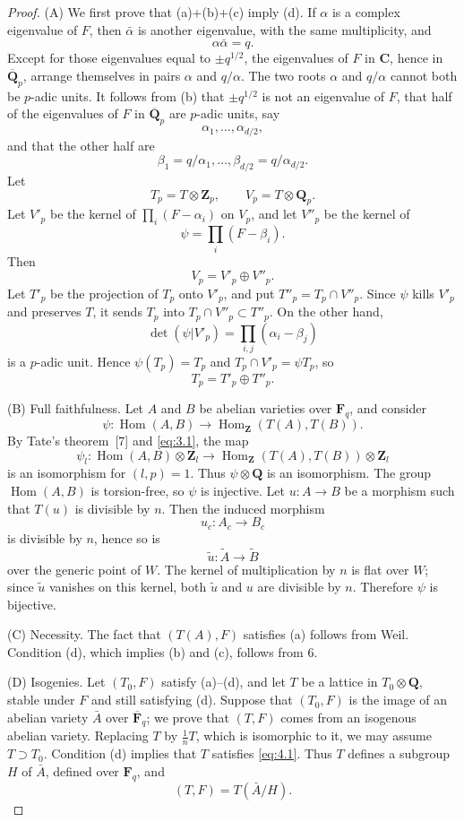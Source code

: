 \documentclass[10pt]{amsart}
\theoremstyle{plain}
\theoremstyle{remark}
\DeclareMathOperator{\Hom}{Hom}
\begin{document}
\begin{proof}
(A) We first prove that (a)+(b)+(c) imply (d). If $\alpha$ is a complex eigenvalue of $F$, then $\bar\alpha$ is another eigenvalue, with the same multiplicity, and
\[
\alpha\bar\alpha=q.
\]
Except for those eigenvalues equal to $\pm q^{1/2}$, the eigenvalues of $F$ in $\mathbf C$, hence in $\overline{\mathbf Q}_p$, arrange themselves in pairs $\alpha$ and $q/\alpha$. The two roots $\alpha$ and $q/\alpha$ cannot both be $p$-adic units. It follows from (b) that $\pm q^{1/2}$ is not an eigenvalue of $F$, that half of the eigenvalues of $F$ in $\overline{\mathbf Q}_p$ are $p$-adic units, say
\[
\alpha_1,\ldots,\alpha_{d/2},
\]
and that the other half are
\[
\beta_1=q/\alpha_1,\ldots,\beta_{d/2}=q/\alpha_{d/2}.
\]
Let
\[
T_p=T\otimes \mathbf Z_p,
\qquad
V_p=T\otimes \mathbf Q_p.
\]
Let $V'_p$ be the kernel of $\prod_i(F-\alpha_i)$ on $V_p$, and let $V''_p$ be the kernel of
\[
\psi=\prod_i(F-\beta_i).
\]
Then
\[
V_p=V'_p\oplus V''_p.
\]
Let $T'_p$ be the projection of $T_p$ onto $V'_p$, and put $T''_p=T_p\cap V''_p$. Since $\psi$ kills $V'_p$ and preserves $T$, it sends $T_p$ into $T_p\cap V''_p\subset T''_p$. On the other hand,
\[
\det(\psi|V'_p)=\prod_{i,j}(\alpha_i-\beta_j)
\]
is a $p$-adic unit. Hence $\psi(T_p)=T_p$ and $T_p\cap V'_p=\psi T_p$, so
\[
T_p=T'_p\oplus T''_p.
\]

(B) Full faithfulness. Let $A$ and $B$ be abelian varieties over $\mathbf F_q$, and consider
\[
\psi:\Hom(A,B)\to \Hom_{\mathbf Z}(T(A),T(B)).
\]
By Tate's theorem~[7] and \eqref{eq:3.1}, the map
\[
\psi_l:\Hom(A,B)\otimes \mathbf Z_l\to
\Hom_{\mathbf Z}(T(A),T(B))\otimes \mathbf Z_l
\]
is an isomorphism for $(l,p)=1$. Thus $\psi\otimes \mathbf Q$ is an isomorphism. The group $\Hom(A,B)$ is torsion-free, so $\psi$ is injective. Let $u:A\to B$ be a morphism such that $T(u)$ is divisible by $n$. Then the induced morphism
\[
u_c:A_c\to B_c
\]
is divisible by $n$, hence so is
\[
\widetilde u:\widetilde A\to \widetilde B
\]
over the generic point of $W$. The kernel of multiplication by $n$ is flat over $W$; since $\widetilde u$ vanishes on this kernel, both $\widetilde u$ and $u$ are divisible by $n$. Therefore $\psi$ is bijective.

(C) Necessity. The fact that $(T(A),F)$ satisfies (a) follows from Weil. Condition (d), which implies (b) and (c), follows from 6.

(D) Isogenies. Let $(T_0,F)$ satisfy (a)--(d), and let $T$ be a lattice in $T_0\otimes \mathbf Q$, stable under $F$ and still satisfying (d). Suppose that $(T_0,F)$ is the image of an abelian variety $\bar A$ over $\overline{\mathbf F}_q$; we prove that $(T,F)$ comes from an isogenous abelian variety. Replacing $T$ by $\frac1nT$, which is isomorphic to it, we may assume $T\supset T_0$. Condition (d) implies that $T$ satisfies \eqref{eq:4.1}. Thus $T$ defines a subgroup $H$ of $\bar A$, defined over $\mathbf F_q$, and
\[
(T,F)=T(\bar A/H).
\]


\end{proof}
\end{document}
